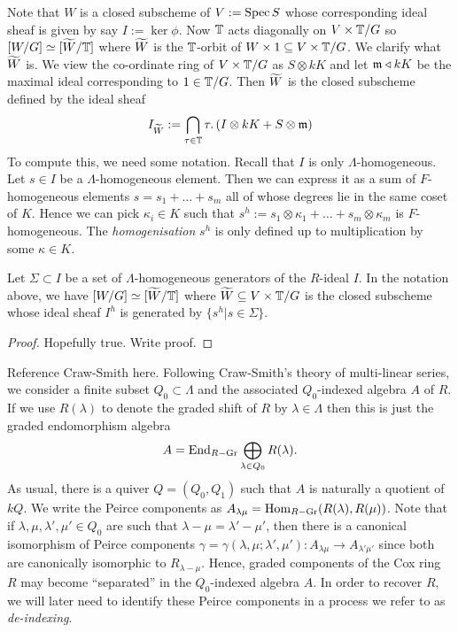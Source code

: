 \documentclass[12pt]{amsart}
\begin{document}
Note that $W$ is a closed subscheme of $V:= \operatorname{Spec} S$ whose corresponding ideal sheaf is given by say $I:= \ker \phi$. Now $\mathbb{T}$ acts diagonally on $V \times \mathbb{T}/G$ so $[W/G] \simeq [{\widetilde{W}}/\mathbb{T}]$ where ${\widetilde{W}}$ is the $\mathbb{T}$-orbit of $W \times 1 \subseteq V \times \mathbb{T}/G$. We clarify what ${\widetilde{W}}$ is. We view the co-ordinate ring of $V \times \mathbb{T}/G$ as $S \otimes kK$ and let $\mathfrak{m}\triangleleft kK$ be the maximal ideal corresponding to $1 \in \mathbb{T}/G$. Then ${\widetilde{W}}$ is the closed subscheme defined by the ideal sheaf
$$ I_{{\widetilde{W}}} := \bigcap_{\tau \in \mathbb{T}} \tau.\left(I \otimes kK + S \otimes \mathfrak{m} \right)$$
To compute this, we need some notation. Recall that $I$ is only $\Lambda$-homogeneous. Let $s \in I$ be a $\Lambda$-homogeneous element. Then we can express it as a sum of $F$-homogeneous elements $s = s_1 + \ldots + s_m$ all of whose degrees lie in the same coset of $K$. Hence we can pick $\kappa_i \in K$ such that $s^h := s_1 \otimes \kappa_1 + \ldots + s_m \otimes \kappa_m$ is $F$-homogeneous. The {\em homogenisation} $s^h$ is only defined up to multiplication by some $\kappa \in K$. 

\begin{proposition}  \label{prop:torusquotient}
Let $\Sigma \subset I$ be a set of $\Lambda$-homogeneous generators of the $R$-ideal $I$. In the notation above, we have $[W/G] \simeq [{\widetilde{W}}/\mathbb{T}]$ where ${\widetilde{W}} \subseteq V \times \mathbb{T}/G$ is the closed subscheme whose ideal sheaf $I^h$ is generated by $\{s^h | s \in \Sigma\}$. 
\end{proposition}
\begin{proof}
{\red Hopefully true. Write proof.}
\end{proof}

{\red Reference Craw-Smith here}. Following Craw-Smith's theory of multi-linear series, we consider a finite subset $Q_0 \subset \Lambda$ and the associated $Q_0$-indexed algebra $A$ of $R$. If we use $R(\lambda)$ to denote the graded shift of $R$ by $\lambda \in \Lambda$ then this is just the graded endomorphism algebra
$$ A = \operatorname{End}_{R-\operatorname{Gr}} \bigoplus_{\lambda \in Q_0} R(\lambda).$$
As usual, there is a quiver $Q = (Q_0,Q_1)$ such that $A$ is naturally a quotient of $kQ$. 
We write the Peirce components as $A_{\lambda\mu} = \operatorname{Hom}_{R-\operatorname{Gr}}(R(\lambda),R(\mu))$. Note that if $\lambda,\mu,\lambda',\mu' \in Q_0$ are such that $\lambda - \mu = \lambda' - \mu'$, then there is a canonical isomorphism of Peirce components $\gamma = \gamma(\lambda,\mu;\lambda',\mu') \colon A_{\lambda\mu} \to A_{\lambda'\mu'}$ since both are canonically isomorphic to $R_{\lambda - \mu}$. Hence, graded components of the Cox ring $R$ may become ``separated'' in the $Q_0$-indexed algebra $A$. In order to recover $R$, we will later need to identify these Peirce components in a process we refer to as {\em de-indexing}. 
\end{document}
